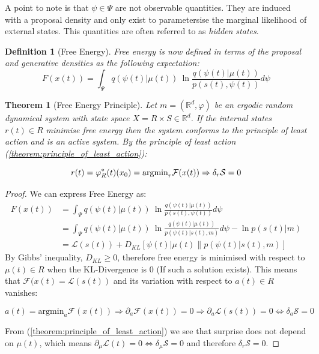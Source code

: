\documentclass{article}
\newcommand{\refp}[1]{(\ref{#1})}
\newcommand{\R}{\mathbb{R}}
\newtheorem{theorem}{Theorem}
\newtheorem{definition}{Definition}
\begin{document}
A point to note is that $\psi \in \Psi$ are not observable quantities. They are induced with a proposal density and only exist to parametersise the marginal likelihood of external states. This quantities are often referred to as \textit{hidden states}.

\begin{definition}[Free Energy]\label{eq:free_energy}
Free energy is now defined in terms of the proposal and generative  densities as the following expectation:
$$
F(x(t)) = \int_\Psi q(\psi(t) | \mu(t))\ \ln\frac{q(\psi(t) | \mu(t))}{p(s(t), \psi(t))} d\psi
$$
\end{definition}

\begin{theorem}[Free Energy Principle]\label{theorem:free_energy_principle}
Let $ m = (\R^d, \varphi)$ be an ergodic random dynamical system with state space $X = R \times S \in \R^d$. If the internal states $r(t) \in R$ minimise free energy then the system conforms to the principle of least action and is an active system. By the principle of least action \refp{theorem:principle_of_least_action}:

$$
r(t) = \varphi_R^*(t)(x_0) = \text{argmin}_{r} \mathcal{F}(x(t)) \Rightarrow \delta_r \mathcal{S} = 0 \\
$$
\end{theorem}

\begin{proof}
	We can express Free Energy as:
	\begin{equation}\label{eq:free_energy_decomposition}
	\begin{aligned}
		F(x(t)) &= \int_\Psi q(\psi(t) | \mu(t))\ \ln\frac{q(\psi(t) | \mu(t))}{p(s(t), \psi(t))} d\psi \\
		&= \int_\Psi q(\psi(t) | \mu(t))\ \ln\frac{q(\psi(t) | \mu(t))}{p(\psi(t) | s(t), m)} d\psi - \ln p(s(t) | m) \\
		&= \mathcal{L}(s(t)) + D_{KL}\left[ \psi(t) | \mu(t) \| p(\psi(t) | s(t), m) \right]
	\end{aligned}
	\end{equation}
	By Gibbs' inequality, $D_{KL} \geq 0$, therefore free energy is minimised with respect to $\mu(t) \in R$ when the KL-Divergence is 0 (If such a solution exists). This means that $\mathcal{F}(x(t) = \mathcal{L}(s(t))$ and its variation with respect to $a(t) \in R$ vanishes:
	
	$$
	a(t) = \text{argmin}_a\mathcal{F}(x(t)) \Rightarrow \partial_a \mathcal{F}(x(t)) = 0 \Rightarrow \partial_a \mathcal{L}(s(t)) = 0 \Leftrightarrow \delta_a \mathcal{S} = 0
	$$
	
	From \refp{theorem:principle_of_least_action} we see that surprise does not depend on $\mu(t)$, which means $\partial_\mu \mathcal{L}(t) = 0 \Leftrightarrow \delta_\mu \mathcal{S} = 0$ and therefore $\delta_r \mathcal{S} = 0$.
\end{proof}
\end{document}
